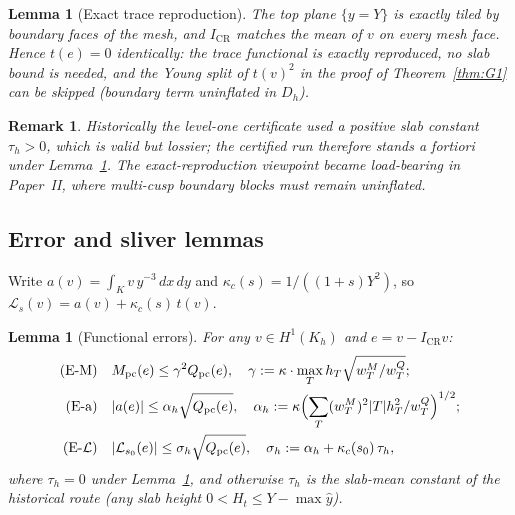 \documentclass[11pt]{amsart}
\newtheorem{lemma}[theorem]{Lemma}
\newtheorem{remark}[theorem]{Remark}
\begin{document}
\begin{lemma}[Exact trace reproduction]\label{lem:D0}
The top plane $\{y=Y\}$ is exactly tiled by boundary faces of the mesh,
and $I_{\mathrm{CR}}$ matches the mean of $v$ on every mesh face.  Hence
$t(e)=0$ identically: the trace functional is exactly reproduced, no
slab bound is needed, and the Young split of $t(v)^2$ in the proof of
Theorem~\ref{thm:G1} can be skipped (boundary term uninflated in $D_h$).
\end{lemma}

\begin{remark}
Historically the level-one certificate used a positive slab constant
$\tau_h>0$, which is valid but lossier; the certified run therefore
stands a fortiori under Lemma~\ref{lem:D0}.  The exact-reproduction
viewpoint became load-bearing in Paper~II, where multi-cusp boundary
blocks must remain uninflated.
\end{remark}

\subsection{Error and sliver lemmas}

Write $a(v)=\int_K v\,y^{-3}\,dx\,dy$ and
$\kappa_c(s)=1/((1+s)Y^2)$, so
$\mathcal{L}_s(v)=a(v)+\kappa_c(s)\,t(v)$.

\begin{lemma}[Functional errors]\label{lem:E}
For any $v\in H^1(K_h)$ and $e=v-I_{\mathrm{CR}}v$:
\begin{align*}
  \text{(E-M)}\quad
  &M_{\mathrm{pc}}(e)\le\gamma^2 Q_{\mathrm{pc}}(e),
  \quad\gamma:=\kappa\cdot\max_T h_T\sqrt{w_T^M/w_T^Q};\\
  \text{(E-a)}\quad
  &|a(e)|\le\alpha_h\sqrt{Q_{\mathrm{pc}}(e)},
  \quad\alpha_h:=\kappa\Bigl(\sum_T(w_T^M)^2|T|h_T^2/w_T^Q\Bigr)^{1/2};\\
  \text{(E-$\mathcal{L}$)}\quad
  &|\mathcal{L}_{s_0}(e)|\le\sigma_h\sqrt{Q_{\mathrm{pc}}(e)},
  \quad\sigma_h:=\alpha_h+\kappa_c(s_0)\,\tau_h,
\end{align*}
where $\tau_h=0$ under Lemma~\ref{lem:D0}, and otherwise $\tau_h$ is the
slab-mean constant of the historical route (any slab height
$0<H_t\le Y-\max\hat y$).
\end{lemma}
\end{document}
